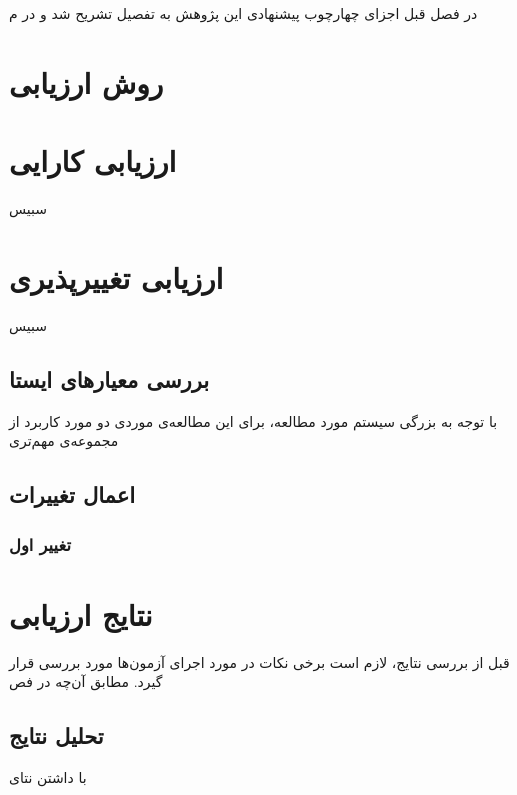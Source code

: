 در فصل قبل اجزای چهارچوب پیشنهادی این پژوهش به تفصیل تشریح شد و در م
\section{روش ارزیابی}
\section{ارزیابی کارایی}
سبیس
\section{ارزیابی تغییرپذیری}
سبیس
\subsection{بررسی معیارهای  ایستا }
با توجه به بزرگی سیستم مورد مطالعه، برای این مطالعه‌ی موردی دو مورد کاربرد از مجموعه‌ی مهم‌تری
\subsection{اعمال تغییرات}
\subsubsection{تغییر اول}

\section{نتایج ارزیابی}
قبل از بررسی نتایج، لازم است برخی نکات در مورد اجرای آزمون‌ها مورد بررسی قرار گیرد. مطابق آن‌چه در فص

\subsection{تحلیل نتایج}
با داشتن نتای